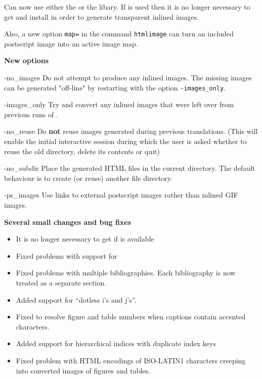 \begin{htmllist}
Can now use either the  or the  libary.
If  is used then it is no longer necessary to get and
install  in order to generate transparent inlined 
images.

Also, a new option \texttt{map=} in the 
command \texttt{htmlimage} can turn an included postscript image into an active
image map.

\item[\textbf{New options}] \hfill
\begin{htmllist}
\item [-no\_images]
Do not attempt to produce any inlined images. 
The missing images can be generated "off-line" by restarting \latextohtml{}
with the option \texttt{-images\_only}.
\item [-images\_only]
Try and convert any inlined images that were left over from previous
runs of \latextohtml. 
\item [-no\_reuse]
Do \textbf{not} reuse images generated during previous translations.
(This will enable the initial interactive session during which the user is
asked whether to reuse the old directory, delete its contents or quit)
\item [-no\_subdir]
Place the generated HTML files  in the 
current directory. The default behaviour is to create (or reuse)
another file directory.
\item [-ps\_images]
Use links to external postscript images rather than inlined GIF images.
\end{htmllist}
\item[\textbf{Several small changes and bug fixes}] \hfill
\begin{itemize}
\item It is no longer necessary to get  if 
is available
\item Fixed problems with support for 
\item Fixed problems with multiple bibliographies. Each bibliography
is now treated as a separate section.
\item Added support for ``dotless i's and j's''.
\item  Fixed to resolve figure and table numbers when captions contain
accented characters.
\item Added support for hierarchical indices with duplicate index keys
\item Fixed problem with HTML encodings of ISO-LATIN1 characters   
creeping into converted images of figures and tables.

\end{itemize}
\end{htmllist}
